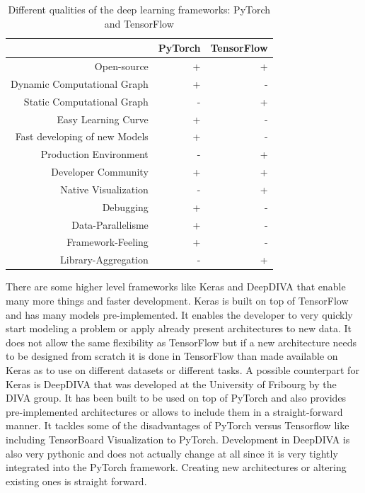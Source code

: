 \begin{table}[t] \centering
{}
\caption{Different qualities of the deep learning frameworks: PyTorch and TensorFlow}
\begin{tabular}{@{}rrr@{}}
\toprule & PyTorch & TensorFlow \\
\midrule
Open-source									& + & + \\
Dynamic Computational Graph			& + & -  \\
Static Computational Graph				& - & +  \\
Easy Learning Curve							& + & -  \\
Fast developing of new Models			& + & -  \\
Production Environment					& - & + \\
Developer Community						& + & + \\
Native Visualization							& - & +  \\
Debugging										& + & -  \\
Data-Parallelisme								& + & -  \\
Framework-Feeling							& + & -  \\
Library-Aggregation							& - & +  \\

\bottomrule
\end{tabular}
\label{tbl:DeepLearningFrameworks}
\end{table}

There are some higher level frameworks like Keras \cite{keras} and DeepDIVA \cite{deepdiva} that enable many more things and faster development. Keras is built on top of TensorFlow and has many models pre-implemented. It enables the developer to very quickly start modeling a problem or apply already present architectures to new data. It does not allow the same flexibility as TensorFlow but if a new architecture needs to be designed from scratch it is done in TensorFlow than made available on Keras as to use on different datasets or different tasks. A possible counterpart for Keras is DeepDIVA that was developed at the University of Fribourg by the DIVA group. It has been built to be used on top of PyTorch and also provides pre-implemented architectures or allows to include them in a straight-forward manner. It tackles some of the disadvantages of PyTorch versus Tensorflow like including TensorBoard Visualization to PyTorch. Development in DeepDIVA is also very pythonic and does not actually change at all since it is very tightly integrated into the PyTorch framework. Creating new architectures or altering existing ones is straight forward.

